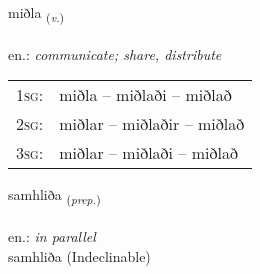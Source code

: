 \documentclass[frontgrid, backgrid]{flacards}\usepackage[]{graphicx}\usepackage[]{xcolor}
\begin{document}
\renewcommand{\flhead}{\vskip5pt \fboxsep=0pt {\small\bfseries\footnotesize Sagnorð | Verb}}
\renewcommand{\fcfoot}{\vskip5pt \fboxsep=0pt \hspace{2pt}{\small\bfseries\footnotesize 2K}}

\renewcommand{\blhead}{\vskip5pt {\small\bfseries\footnotesize Sagnorð | Verb }}
\renewcommand{\bcfoot}{\vskip5pt \hspace{2pt}{\small\bfseries\footnotesize 2K}}


{miðla \small{\textsubscript{(\textit{v.})}} \\[1ex] %
\textphonetic{[mɪðla]} \\
en.: \emph{communicate; share, distribute} \\  [2ex]
\renewcommand*{\arraystretch}{0.8}
\begin{tabular}{p{1cm}l}
\textsc{1sg}: & miðla -- miðlaði -- miðlað \\ 
\textsc{2sg}: & miðlar -- miðlaðir -- miðlað \\ 
\textsc{3sg}: & miðlar -- miðlaði -- miðlað \\ 
\end{tabular}
}


\renewcommand{\flhead}{\vskip5pt \fboxsep=0pt {\small\bfseries\footnotesize Forsetning | Preposition}}
\renewcommand{\fcfoot}{\vskip5pt \fboxsep=0pt \hspace{2pt}{\small\bfseries\footnotesize 2K}}

\renewcommand{\blhead}{\vskip5pt {\small\bfseries\footnotesize Forsetning | Preposition }}
\renewcommand{\bcfoot}{\vskip5pt \hspace{2pt}{\small\bfseries\footnotesize 2K}}


{samhliða \small{\textsubscript{(\textit{prep.})}} \\[1ex]
 \\
en.: \emph{in parallel} \\  [2ex]
samhliða (Indeclinable)}
\end{document}
